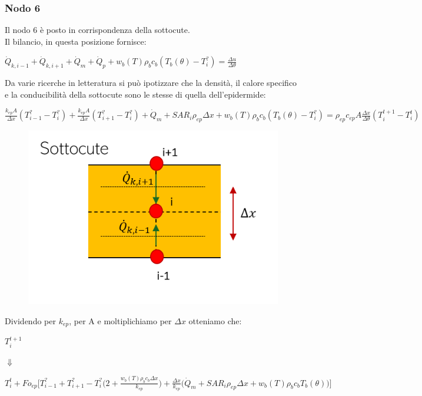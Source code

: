 \subsubsection*{Nodo 6}

Il nodo 6 è posto in corrispondenza della sottocute.\\
Il bilancio, in questa posizione fornisce:
\vspace{0.5cm}
\begin{center}
	$ \Dot{Q} _{k, i-1} +\Dot{Q} _{k, i+1}+ \Dot{Q} _{m} +\Dot{Q} _{p}+ w_b (T) \rho _b c_b (T_b(\theta)-T_i ^?)= \frac{\Delta u}{\Delta \theta} $
\end{center}
\vspace{0.5cm}
Da varie ricerche in letteratura si può ipotizzare che la densità, il calore specifico  e la conducibilità della sottocute sono le stesse di quella dell'epidermide:
\vspace{0.5cm}
\begin{center}
	$ \frac{k_{ep} A }{\Delta x}(T_{i-1} ^? - T_i ^? ) + \frac{k_{ep} A }{\Delta x}(T_{i+1} ^? - T_i ^? )+ \Dot{Q} _{m} + SAR_i \rho _{ep} \Delta x  + w_b (T) \rho _b c_b (T_b(\theta)-T_i ^?) = \rho _{ep} c_{ep} A \frac{\Delta x}{ \Delta \theta}(T_i ^{t+1} - T_i ^t )$
\end{center}
\begin{figure}[H]
    \centering
    \includegraphics[width=.6\textwidth]{Immagini/Nodi/nodo6.png} 
    \label{nodo2}
\end{figure}
\noindent

\noindent
Dividendo per $k_{ep}$, per A e moltiplichiamo per $\Delta x$ otteniamo che:
\begin{center}
	$T_i ^{t+1} $
\end{center}
\begin{center}
	$\Downarrow$
\end{center}
\begin{center}
	$T_i ^t + Fo_{ep} \Bigg[ T_{i-1} ^? + T_{i+1} ^?- T_i ^? \Big(2 + \frac{ w_b (T) \rho _b c_b \Delta x }{k_{ep}} \Big) +  \frac{\Delta x }{k_{ep}} \Big(\Dot{Q} _{m} +  SAR_i \rho _{ep} \Delta x + w_b (T) \rho _b c_b T_b(\theta)\Big) \Bigg]$
\end{center}
